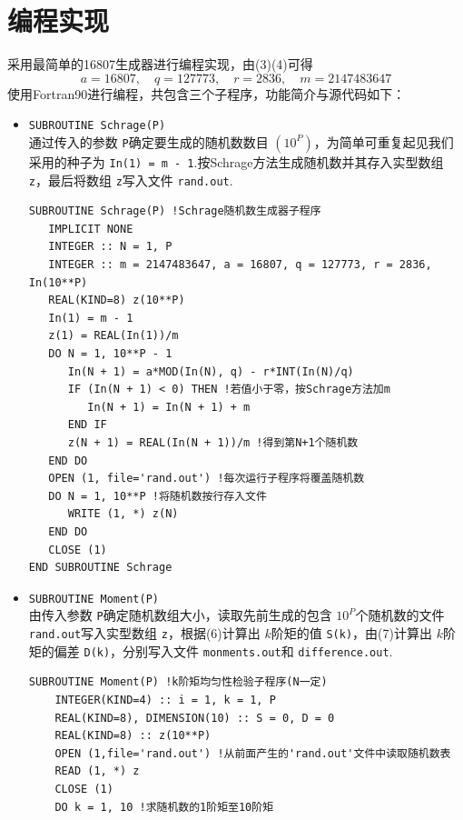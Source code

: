 \documentclass[12pt,a4paper,utf8]{ctexart}
\begin{document}
\section{编程实现}
采用最简单的16807生成器进行编程实现，由(3)(4)可得
\begin{equation}
    a=16807,\quad q=127773,\quad r=2836,\quad m=2147483647
\end{equation}
使用Fortran90进行编程，共包含三个子程序，功能简介与源代码如下：
\begin{itemize}
    \item \texttt{SUBROUTINE Schrage(P)}\\
        通过传入的参数
        \texttt{P}确定要生成的随机数数目
        $(10^P)$，为简单可重复起见我们采用的种子为
        \texttt{In(1) = m - 1}.按Schrage方法生成随机数并其存入实型数组
        \texttt{z}，最后将数组 \texttt{z}写入文件 \texttt{rand.out}.
\begin{framed}
\begin{lstlisting}
SUBROUTINE Schrage(P) !Schrage随机数生成器子程序
   IMPLICIT NONE
   INTEGER :: N = 1, P 
   INTEGER :: m = 2147483647, a = 16807, q = 127773, r = 2836, In(10**P)
   REAL(KIND=8) z(10**P)
   In(1) = m - 1
   z(1) = REAL(In(1))/m
   DO N = 1, 10**P - 1
      In(N + 1) = a*MOD(In(N), q) - r*INT(In(N)/q)
      IF (In(N + 1) < 0) THEN !若值小于零，按Schrage方法加m
         In(N + 1) = In(N + 1) + m
      END IF
      z(N + 1) = REAL(In(N + 1))/m !得到第N+1个随机数
   END DO
   OPEN (1, file='rand.out') !每次运行子程序将覆盖随机数
   DO N = 1, 10**P !将随机数按行存入文件
      WRITE (1, *) z(N)
   END DO
   CLOSE (1)
END SUBROUTINE Schrage
\end{lstlisting}
\end{framed}
    \item \texttt{SUBROUTINE Moment(P)}\\
        由传入参数 \texttt{P}确定随机数组大小，读取先前生成的包含
        $10^P$个随机数的文件
        \texttt{rand.out}写入实型数组 \texttt{z}，根据(6)计算出 $k$阶矩的值
        \texttt{S(k)}，由(7)计算出 $k$阶矩的偏差 \texttt{D(k)}，分别写入文件
        \texttt{monments.out}和 \texttt{difference.out}.
\begin{framed}
\begin{lstlisting}
SUBROUTINE Moment(P) !k阶矩均匀性检验子程序(N一定)
    INTEGER(KIND=4) :: i = 1, k = 1, P
    REAL(KIND=8), DIMENSION(10) :: S = 0, D = 0
    REAL(KIND=8) :: z(10**P)
    OPEN (1,file='rand.out') !从前面产生的'rand.out'文件中读取随机数表
    READ (1, *) z
    CLOSE (1)
    DO k = 1, 10 !求随机数的1阶矩至10阶矩

\end{lstlisting}
\end{framed}
\end{itemize}
\end{document}
